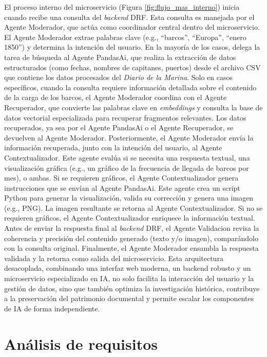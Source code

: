 El proceso interno del microservicio (Figura \ref{fig:flujo_mas_interno}) inicia cuando recibe una consulta del \textit{backend} DRF. Esta consulta es manejada por el Agente Moderador, que actúa como coordinador central dentro del microservicio. El Agente Moderador extrae palabras clave (e.g., “barcos”, “Europa”, “enero 1850”) y determina la intención del usuario. En la mayoría de los casos, delega la tarea de búsqueda al Agente PandasAi, que realiza la extracción de datos estructurados (como fechas, nombres de capitanes, puertos) desde el archivo CSV que contiene los datos procesados del \textit{Diario de la Marina}. Solo en casos específicos, cuando la consulta requiere información detallada sobre el contenido de la carga de los barcos, el Agente Moderador coordina con el Agente Recuperador, que convierte las palabras clave en \textit{embeddings} y consulta la base de datos vectorial especializada para recuperar fragmentos relevantes. Los datos recuperados, ya sea por el Agente PandasAi o el Agente Recuperador, se devuelven al Agente Moderador.
Posteriormente, el Agente Moderador envía la información recuperada, junto con la intención del usuario, al Agente Contextualizador. Este agente evalúa si se necesita una respuesta textual, una visualización gráfica (e.g., un gráfico de la frecuencia de llegada de barcos por mes), o ambas. Si se requieren gráficos, el Agente Contextualizador genera instrucciones que se envían al Agente PandasAi. Este agente crea un script Python para generar la visualización, valida su corrección y genera una imagen (e.g., PNG). La imagen resultante se retorna al Agente Contextualizador. Si no se requieren gráficos, el Agente Contextualizador enriquece la información textual. Antes de enviar la respuesta final al \textit{backend} DRF, el Agente Validacion revisa la coherencia y precisión del contenido generado (texto y/o imagen), comparándolo con la consulta original. Finalmente, el Agente Moderador ensambla la respuesta validada y la retorna como salida del microservicio.
Esta arquitectura desacoplada, combinando una interfaz web moderna, un backend robusto y un microservicio especializado en IA, no solo facilita la interacción del usuario y la gestión de datos, sino que también optimiza la investigación histórica, contribuye a la preservación del patrimonio documental y permite escalar los componentes de IA de forma independiente.


\section{Análisis de requisitos}

